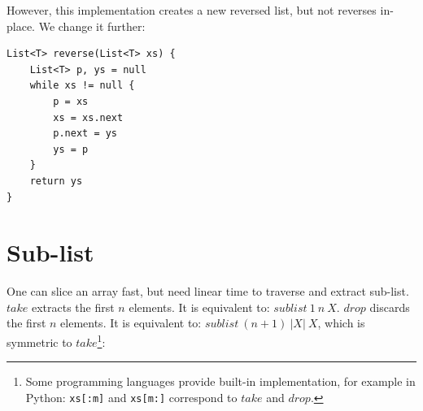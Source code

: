 \documentclass[b5paper]{article}
\begin{document}
However, this implementation creates a new reversed list, but not reverses in-place. We change it further:

\begin{lstlisting}[language=Bourbaki]
List<T> reverse(List<T> xs) {
    List<T> p, ys = null
    while xs != null {
        p = xs
        xs = xs.next
        p.next = ys
        ys = p
    }
    return ys
}
\end{lstlisting}

\begin{Exercise}[label={ex:list-transform}]
\end{Exercise}

\begin{Answer}[ref = {ex:list-transform}]
\end{Answer}

\section{Sub-list}
   
One can slice an array fast, but need linear time to traverse and extract sub-list. $take$ extracts the first $n$ elements. It is equivalent to: $sublist\ 1\ n\ X$. $drop$ discards the first $n$ elements. It is equivalent to: $sublist\ (n+1)\ |X|\ X$, which is symmetric to $take$\footnote{Some programming languages provide built-in implementation, for example in Python: \texttt{xs[:m]} and \texttt{xs[m:]} correspond to $take$ and $drop$.}:

\be
{}
\ee
\end{document}
